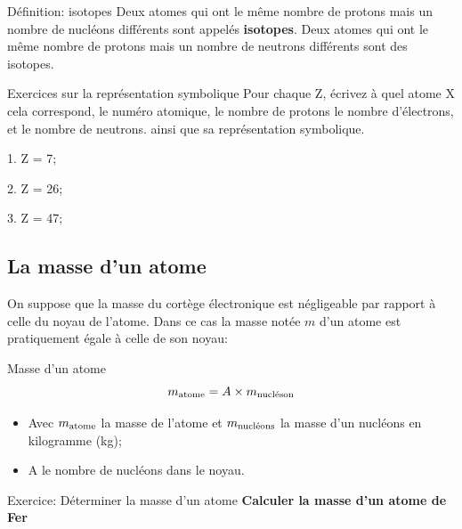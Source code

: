 \documentclass[french]{article}
\begin{document}
\begin{definition}{Définition: isotopes}
	Deux atomes qui ont le même nombre de protons mais un nombre de nucléons différents sont appelés \textbf{isotopes}. Deux atomes qui ont le même nombre de protons mais un nombre de neutrons différents sont des isotopes.
\end{definition}
\vspace{.5cm}

\begin{Exercice}{Exercices sur la représentation symbolique}
	Pour chaque Z, écrivez à quel atome X cela correspond, le numéro atomique, le nombre de protons le nombre d'électrons, et le nombre de neutrons. ainsi que sa représentation symbolique.
	\begin{multicols}{3}
		1. Z = 7; %

		2. Z = 26; %

		3. Z = 47; %
	\end{multicols}
	 \vspace{3cm}
\end{Exercice}

\subsection{La masse d'un atome}

On suppose que la masse du cortège électronique est négligeable par rapport à celle du noyau de l'atome. Dans ce cas la masse notée $m$ d'un atome est pratiquement égale à celle de son noyau:

\begin{definition}{Masse d'un atome}
	\begin{equation}
		m_{\rm atome} = A\times m_{\text{nucléson}}
	\end{equation}
	\begin{itemize}
		\item Avec $m_{\rm atome}$ la masse de l'atome et $m_{\rm \text{nucléons}}$ la masse d'un nucléons en kilogramme (kg);
		\item A le nombre de nucléons dans le noyau.
	\end{itemize}
\end{definition}


\begin{Exercice}{Exercice:  Déterminer la masse d'un atome}
	\textbf{Calculer la masse d'un atome de Fer }
	
	\vspace{2cm}
\end{Exercice}
\end{document}
